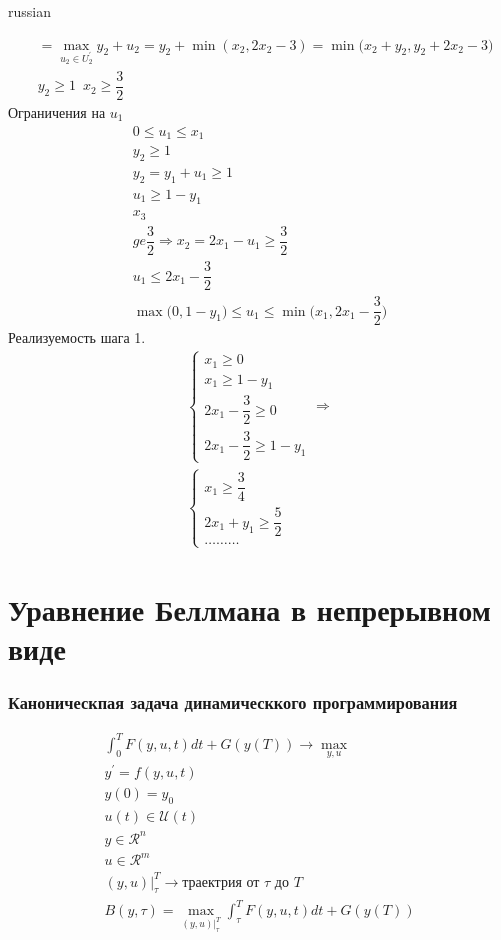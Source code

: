 \documentclass{article}
\begin{document}
\begin{otherlanguage*}{russian}
\begin{itemize}
\begin{enumerate}
\begin{align*}
& = \max_{u_2 \in U_2^{'}} y_2 + u_2 = y_2 + \min (x_2, 2x_2 - 3)  = \min \Big( x_2 + y_2, y_2 +  2x_2 - 3 \Big) \\
& y_2 \ge 1 \,\,\, x_2 \ge \dfrac{3}{2}
\end{align*}
Ограничения на $ u_1 $
\begin{align*}
0 \le u_1 \le x_1 \\
y_2 \ge 1 \\
y_2 = y_1 + u_1 \ge 1 \\
u_1 \ge 1 - y _1 \\
x_3 \\ge \dfrac{3}{2} \Rightarrow x_2 = 2 x_1 - u_1 \ge \dfrac{3}{2} \\
u_1 \le 2 x_1 - \dfrac{3}{2} \\
\max \Big( 0, 1 - y_1 \Big) \le u_1 \le \min \Big( x_1, 2 x_1 - \dfrac{3}{2} \Big)
\end{align*}
Реализуемость шага 1. 
\begin{align*}
\begin{cases} 
x_1 \ge 0 \\
x_1 \ge 1 - y_1 \\
2x_1 - \dfrac{3}{2} \ge 0 \\
2 x_1 - \dfrac{3}{2} \ge 1 - y_1 
\end{cases} \Rightarrow \\
\begin{cases}
x_1 \ge \dfrac{3}{4} \\
2x_1 + y_1 \ge \dfrac{5}{2} \\
\ldots \ldots \ldots
\end{cases} 
\end{align*}
\end{enumerate}
\end{itemize}
\section*{Уравнение Беллмана в непрерывном виде}
\subsubsection*{Каноническпая задача динамическкого программирования}
\begin{align*}
\int_0^T F(y, u, t) dt + G(y(T)) \rightarrow \max_{y, u} \\
y^{'} = f(y, u, t) \\
y(0) = y_0 \\
u(t) \in \mathcal{U}(t) \\
y \in \mathcal{R}^n \\
u \in \mathcal{R}^m \\
(y, u)|^T_{\tau} \rightarrow \text{траектрия от } \tau \text{ до } T \\
B(y, \tau) = \max_{(y, u)|^T_{\tau}} \int_\tau^T F(y, u, t) dt + G(y(T)) 
\end{align*}

\end{otherlanguage*}
\end{document}
